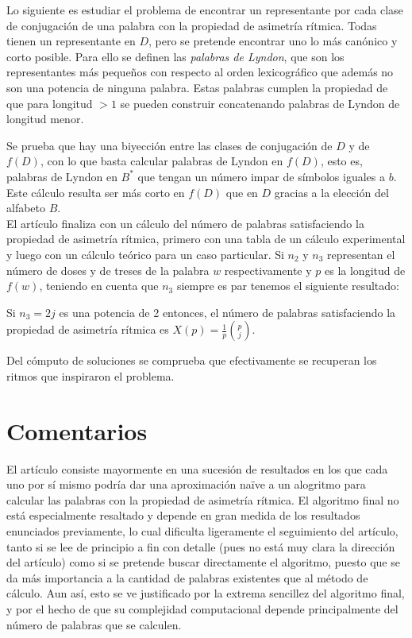 \documentclass[twoside]{article}
\begin{document}
Lo siguiente es estudiar el problema de encontrar un representante por cada clase de conjugación de una palabra con la propiedad de asimetría rítmica. Todas tienen un representante en $D$, pero se pretende encontrar uno lo más canónico y corto posible. Para ello se definen las \emph{palabras de Lyndon}, que son los representantes más pequeños con respecto al orden lexicográfico que además no son una potencia de ninguna palabra. Estas palabras cumplen la propiedad de que para longitud $>1$ se pueden construir concatenando palabras de Lyndon de longitud menor. 

Se prueba que hay una biyección entre las clases de conjugación de $D$ y de $f(D)$, con lo que basta calcular palabras de Lyndon en $f(D)$, esto es, palabras de Lyndon en $B^*$ que tengan un número impar de símbolos iguales a $b$. Este cálculo resulta ser más corto en $f(D)$ que en $D$ gracias a la elección del alfabeto $B$. \\


El artículo finaliza con un cálculo del número de palabras satisfaciendo la propiedad de asimetría rítmica, primero con una tabla de un cálculo experimental y luego con un cálculo teórico para un caso particular. Si $n_2$ y $n_3$ representan el número de doses y de treses de la palabra $w$ respectivamente y $p$ es la longitud de $f(w)$, teniendo en cuenta que $n_3$ siempre es par tenemos el siguiente resultado:

\begin{prop}
Si $n_3=2j$ es una potencia de 2 entonces, el número de palabras satisfaciendo la propiedad de asimetría rítmica es $X(p)=\frac{1}{p}\binom{p}{j}$. 
\end{prop}

Del cómputo de soluciones se comprueba que efectivamente se recuperan los ritmos que inspiraron el problema. 

\section{Comentarios}

El artículo consiste mayormente en una sucesión de resultados en los que cada uno por sí mismo podría dar una aproximación naïve a un alogritmo para calcular las palabras con la propiedad de asimetría rítmica. El algoritmo final no está especialmente resaltado y depende en gran medida de los resultados enunciados previamente, lo cual dificulta ligeramente el seguimiento del artículo, tanto si se lee de principio a fin con detalle (pues no está muy clara la dirección del artículo) como si se pretende buscar directamente el algoritmo, puesto que se da más importancia a la cantidad de palabras existentes que al método de cálculo. Aun así, esto se ve justificado por la extrema sencillez del algoritmo final, y por el hecho de que su complejidad computacional depende principalmente del número de palabras que se calculen. 
\end{document}
